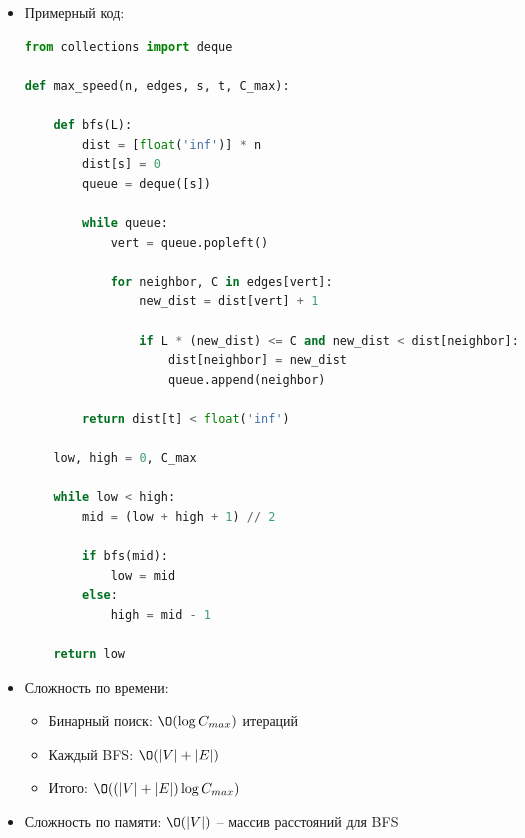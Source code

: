 \begin{enumerate}
\begin{itemize}
\begin{enumerate}
        Если ребро $(u, v)$ с ёмкость $C_{u,v}$ удовлетворяет критерию $L \cdot (dist[u] + 1) \leq C_{u,v}$, то добавляем в очередь

        \item Если $t$ достижима, то $L$ подходит.
        Значит, на следующей итерации бин. поиска берем значение больше, иначе -- меньше.
      \end{enumerate}

      \item Примерный код:

      \begin{lstlisting}[language=Python]
from collections import deque

def max_speed(n, edges, s, t, C_max):
    
    def bfs(L):
        dist = [float('inf')] * n
        dist[s] = 0
        queue = deque([s])
        
        while queue:
            vert = queue.popleft()

            for neighbor, C in edges[vert]:
                new_dist = dist[vert] + 1

                if L * (new_dist) <= C and new_dist < dist[neighbor]:
                    dist[neighbor] = new_dist
                    queue.append(neighbor)
        
        return dist[t] < float('inf')
    
    low, high = 0, C_max

    while low < high:
        mid = (low + high + 1) // 2

        if bfs(mid):
            low = mid
        else:
            high = mid - 1
    
    return low
      \end{lstlisting}

      \item Сложность по времени:
      \begin{itemize}
        \item Бинарный поиск: $\O(\log C_{max})$ итераций
        \item Каждый BFS: $\O(|V| + |E|)$
        \item Итого: $\O((|V| + |E|) \log C_{max})$
      \end{itemize}

      \item Сложность по памяти: $\O(|V|)$ -- массив расстояний для BFS

    \end{itemize}

\end{enumerate}

